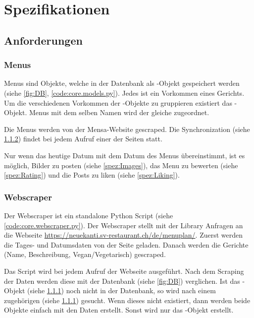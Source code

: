 \chapter{Spezifikationen}

\section{Anforderungen} \label{sec:Anforderungen}
\subsection{Menus} \label{spez:Menus}

Menus sind Objekte, welche in der Datenbank als -Objekt gespeichert
werden (siehe \ref{fig:DB}, \ref{code:core.models.py}). Jedes  ist
ein Vorkommen eines Gerichts. Um die verschiedenen Vorkommen der
-Objekte zu gruppieren existiert das -Objekt.
Menus mit dem selben Namen wird der gleiche  zugeordnet.

Die Menus werden von der Mensa-Website gescraped. Die Synchronization (siehe
\ref{spez:Webscraper}) findet bei jedem Aufruf einer der Seiten statt.

Nur wenn das heutige Datum mit dem Datum des Menus übereinstimmt, ist es
möglich, Bilder zu posten (siehe \ref{spez:Images}), das Menu zu bewerten (siehe
\ref{spez:Rating}) und die Posts zu liken (siehe \ref{spez:Liking}).

\subsection{Webscraper} \label{spez:Webscraper}

Der Webscraper ist ein standalone Python Script (siehe
\ref{code:core.webscraper.py}). Der Webscraper stellt mit der Library
 Anfragen an die Webseite
\url{https://neuekanti.sv-restaurant.ch/de/menuplan/}. Zuerst werden die Tages-
und Datumsdaten von der Seite geladen. Danach werden die Gerichte (Name,
Beschreibung, Vegan/Vegetarisch) gescraped.

Das Script wird bei jedem Aufruf der Webseite ausgeführt. Nach dem Scraping
der Daten werden diese mit der Datenbank (siehe \ref{fig:DB}) verglichen.
Ist das -Objekt (siehe \ref{spez:Menus}) noch nicht in der Datenbank,
so wird nach einem zugehörigen  (siehe \ref{spez:Menus})
gesucht. Wenn dieses nicht existiert, dann werden beide Objekte einfach mit den
Daten erstellt. Sonst wird nur das -Objekt erstellt.

